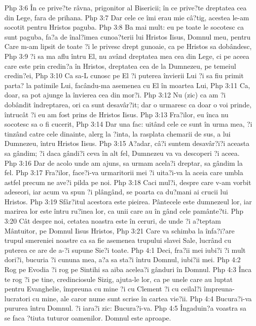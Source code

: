 Php 3:6  În ce prive?te râvna, prigonitor al Bisericii; în ce prive?te dreptatea cea din Lege, fara de prihana.
Php 3:7  Dar cele ce îmi erau mie câ?tig, acestea le-am socotit pentru Hristos paguba.
Php 3:8  Ba mai mult: eu pe toate le socotesc ca sunt paguba, fa?a de înal?imea cunoa?terii lui Hristos Iisus, Domnul meu, pentru Care m-am lipsit de toate ?i le privesc drept gunoaie, ca pe Hristos sa dobândesc,
Php 3:9  ?i sa ma aflu întru El, nu având dreptatea mea cea din Lege, ci pe aceea care este prin credin?a în Hristos, dreptatea cea de la Dumnezeu, pe temeiul credin?ei,
Php 3:10  Ca sa-L cunosc pe El ?i puterea învierii Lui ?i sa fiu primit parta? la patimile Lui, facându-ma asemenea cu El în moartea Lui,
Php 3:11  Ca, doar, sa pot ajunge la învierea cea din mor?i.
Php 3:12  Nu (zic) ca am ?i dobândit îndreptarea, ori ca sunt desavâr?it; dar o urmaresc ca doar o voi prinde, întrucât ?i eu am fost prins de Hristos Iisus.
Php 3:13  Fra?ilor, eu înca nu socotesc sa o fi cucerit,
Php 3:14  Dar una fac: uitând cele ce sunt în urma mea, ?i tinzând catre cele dinainte, alerg la ?inta, la rasplata chemarii de sus, a lui Dumnezeu, întru Hristos Iisus.
Php 3:15  A?adar, câ?i suntem desavâr?i?i aceasta sa gândim; ?i daca gândi?i ceva în alt fel, Dumnezeu va va descoperi ?i aceea.
Php 3:16  Dar de acolo unde am ajuns, sa urmam acela?i dreptar, sa gândim la fel.
Php 3:17  Fra?ilor, face?i-va urmaritorii mei ?i uita?i-va la aceia care umbla astfel precum ne ave?i pilda pe noi.
Php 3:18  Caci mul?i, despre care v-am vorbit adeseori, iar acum va spun ?i plângând, se poarta ca du?mani ai crucii lui Hristos.
Php 3:19  Sfâr?itul acestora este pieirea. Pântecele este dumnezeul lor, iar marirea lor este întru ru?inea lor, ca unii care au în gând cele pamânte?ti.
Php 3:20  Cât despre noi, cetatea noastra este în ceruri, de unde ?i a?teptam Mântuitor, pe Domnul Iisus Hristos,
Php 3:21  Care va schimba la înfa?i?are trupul smereniei noastre ca sa fie asemenea trupului slavei Sale, lucrând cu puterea ce are de a-?i supune Sie?i toate.
Php 4:1  Deci, fra?ii mei iubi?i ?i mult dori?i, bucuria ?i cununa mea, a?a sa sta?i întru Domnul, iubi?ii mei.
Php 4:2  Rog pe Evodia ?i rog pe Sintihi sa aiba acelea?i gânduri în Domnul.
Php 4:3  Înca te rog ?i pe tine, credinciosule Sizig, ajuta-le lor, ca pe unele care au luptat pentru Evanghelie, împreuna cu mine ?i cu Clement ?i cu ceilal?i împreuna-lucratori cu mine, ale caror nume sunt scrise în cartea vie?ii.
Php 4:4  Bucura?i-va pururea întru Domnul. ?i iara?i zic: Bucura?i-va.
Php 4:5  Îngaduin?a voastra sa se faca ?tiuta tuturor oamenilor. Domnul este aproape.
